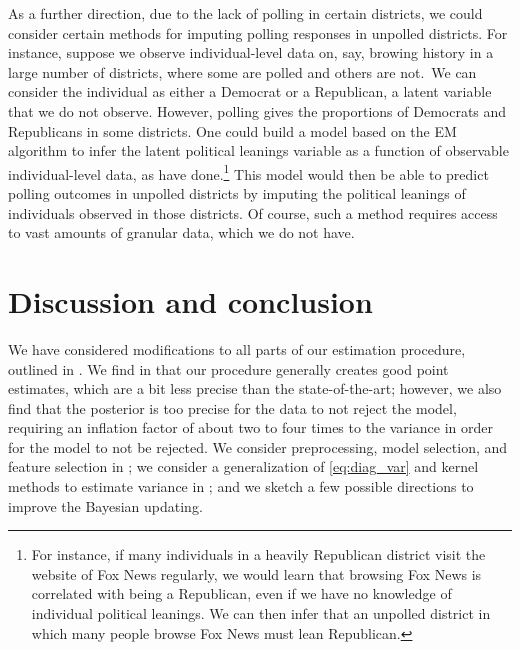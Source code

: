 \documentclass[12pt]{article}
\begin{document}
As a further direction, due to the lack of polling in certain districts, we
could consider certain methods for imputing polling responses in unpolled
districts. For instance, suppose we observe individual-level data on, say,
browing history in a large number of districts, where some are polled and others
are not.~We can consider the individual as either a Democrat or a Republican, a
latent variable that we do not observe. However, polling gives the proportions
of Democrats and Republicans in some districts. One could build a model based on
the EM algorithm to infer the latent political leanings variable as a function
of observable individual-level data, as \cite{comarela2018browse} have
done.\footnote{For instance, if many individuals in a heavily Republican
district visit the website of Fox News regularly, we would learn that browsing
Fox News is correlated with being a Republican, even if we have no knowledge of
individual political leanings. We can then infer that an unpolled district in
which many people browse Fox News must lean Republican.} This model would then
be able to predict polling outcomes in unpolled districts by imputing the
political leanings of individuals observed in those districts. Of course, such a
method requires access to vast amounts of granular data, which we do not have.

\section{Discussion and conclusion}
\label{sec:conc}

We have considered modifications to all parts of our estimation procedure, outlined in . We find in  that our procedure generally creates good point estimates, which are a bit less precise than the state-of-the-art; however, we also find that the posterior is too precise for the data to not reject the model, requiring an inflation factor of about two to four times to the variance in order for the model to not be rejected. We consider preprocessing, model selection, and feature selection in ; we consider a generalization of \eqref{eq:diag_var} and kernel methods to estimate variance in ; and we sketch a few possible directions to improve the Bayesian updating.
\end{document}
